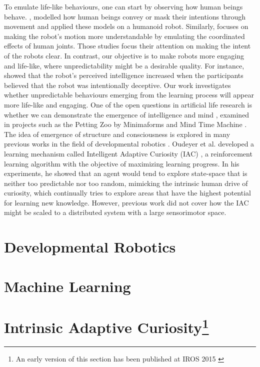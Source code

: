 To emulate life-like behaviours, one can start by observing how human beings behave. \cite{Dragan2015}, \cite{AncaDraga2014} modelled how human beings convey or mask their intentions through movement and applied these models on a humanoid robot. Similarly, \cite{Gielniak2013} focuses on making the robot's motion more understandable by emulating the coordinated effects of human joints. Those studies focus their attention on making the intent of the robots clear. In contrast, our objective is to make robots more engaging and life-like, where unpredictability might be a desirable quality. For instance, \cite{AncaDraga2014} showed that the robot's perceived intelligence increased when the participants believed that the robot was intentionally deceptive. Our work investigates whether unpredictable behaviours emerging from the learning process will appear more life-like and engaging.
One of the open questions in artificial life research is whether we can demonstrate the emergence of intelligence and mind \cite{Bedau2000}, examined in projects such as the Petting Zoo by Minimaforms \cite{Minimaforms} and Mind Time Machine \cite{Ikegami2013}.   The idea of emergence of structure and consciousness is explored in many previous works in the field of developmental robotics \cite{Lungarella2003} \cite{Asada2009} \cite{Kompella2014}.  Oudeyer et al. developed a learning mechanism called Intelligent Adaptive Curiosity (IAC) \cite{Oudeyer2007}, a reinforcement learning algorithm with the objective of maximizing learning progress. In his experiments, he showed that an agent would tend to explore state-space that is neither too predictable nor too random, mimicking the intrinsic human drive of curiosity, which continually tries to explore areas that have the highest potential for learning new knowledge. However, previous work did not cover how the IAC might be scaled to a distributed system with a large sensorimotor space. 

\section{Developmental Robotics}

\section{Machine Learning}


\section[Intrinsic Adaptive Curiosity] {Intrinsic Adaptive Curiosity\footnote{An early version of this section has been published at IROS 2015 \cite{Chan2015} }}


